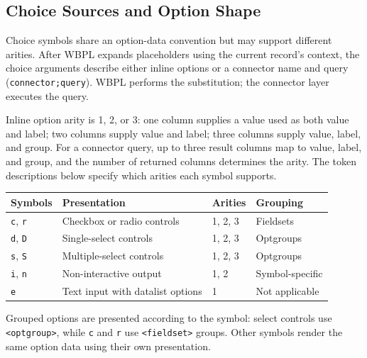 \subsection{Choice Sources and Option Shape}
\label{sec:wbll-choice-sources}

Choice symbols share an option-data convention but may support different arities. After WBPL expands placeholders using the current record's context, the choice arguments describe either inline options or a connector name and query (\texttt{connector;query}). WBPL performs the substitution; the connector layer executes the query.

Inline option arity is 1, 2, or 3: one column supplies a value used as both value and label; two columns supply value and label; three columns supply value, label, and group. For a connector query, up to three result columns map to value, label, and group, and the number of returned columns determines the arity. The token descriptions below specify which arities each symbol supports.

\begin{center}
\begin{tabularx}{\linewidth}{@{}l l l X@{}}
\textbf{Symbols} & \textbf{Presentation} & \textbf{Arities} & \textbf{Grouping} \\
\hline
\texttt{c}, \texttt{r} & Checkbox or radio controls & 1, 2, 3 & Fieldsets \\
\texttt{d}, \texttt{D} & Single-select controls & 1, 2, 3 & Optgroups \\
\texttt{s}, \texttt{S} & Multiple-select controls & 1, 2, 3 & Optgroups \\
\texttt{i}, \texttt{n} & Non-interactive output & 1, 2 & Symbol-specific \\
\texttt{e} & Text input with datalist options & 1 & Not applicable \\
\end{tabularx}
\end{center}

Grouped options are presented according to the symbol: select controls use \texttt{<optgroup>}, while \texttt{c} and \texttt{r} use \texttt{<fieldset>} groups. Other symbols render the same option data using their own presentation.

